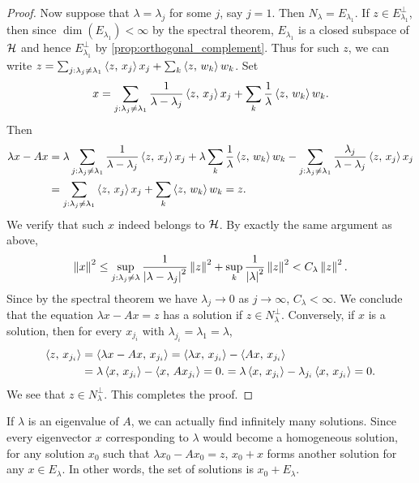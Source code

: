\begin{proof}
    Now suppose that $\lambda = \lambda_{j}$ for some $j$, say $j=1$. Then $N_\lambda = E_{\lambda_1}$. 
    If $z\in E_{\lambda_1}^\perp$, then since $\dim(E_{\lambda_1})<\infty$ by the spectral theorem, 
    $E_{\lambda_1}$ is a closed subspace of $\mathcal{H}$ and hence $E_{\lambda_1}^\perp$ by 
    \cref{prop:orthogonal_complement}. Thus for such $z$, we can write $z = 
    \sum_{j:\lambda_j\neq\lambda_1} \left\langle {z},\, {x_j} \right\rangle x_j + \sum_k\left\langle {z},\, {w_k} \right\rangle w_k$. 
    Set 
    \begin{equation*}
        x = \sum_{j:\lambda_j\neq\lambda_1}\frac{1}{\lambda-\lambda_j}\left\langle {z},\, {x_j} \right\rangle x_j + \sum_k\frac{1}{\lambda}\left\langle {z},\, {w_k} \right\rangle w_k.
    \end{equation*}
    Then 
    \begin{equation*}
        \begin{split}
            \lambda x - Ax 
            &= \lambda\sum_{j:\lambda_j\neq\lambda_1}\frac{1}{\lambda-\lambda_j}\left\langle {z},\, {x_j} \right\rangle x_j + \lambda\sum_k\frac{1}{\lambda}\left\langle {z},\, {w_k} \right\rangle w_k - \sum_{j:\lambda_j\neq\lambda_1}\frac{\lambda_j}{\lambda-\lambda_j}\left\langle {z},\, {x_j} \right\rangle x_j \\
            &= \sum_{j:\lambda_j\neq\lambda_1}\left\langle {z},\, {x_j} \right\rangle x_j + \sum_k\left\langle {z},\, {w_k} \right\rangle w_k = z.
        \end{split}
    \end{equation*}
    We verify that such $x$ indeed belongs to $\mathcal{H}$. By exactly the same argument as above, 
    \begin{equation*}
        \left\lVert {x} \right\rVert^2 \leq \sup_{j:\lambda_j\neq\lambda}\frac{1}{\left\lvert {\lambda-\lambda_j} \right\rvert^2}\left\lVert {z} \right\rVert^2 + \sup_k\frac{1}{\left\lvert {\lambda} \right\rvert^2}\left\lVert {z} \right\rVert^2 < C_\lambda\left\lVert {z} \right\rVert^2.
    \end{equation*}
    Since by the spectral theorem we have $\lambda_j\to 0$ as $j\to\infty$, $C_\lambda<\infty$.
    We conclude that the equation $\lambda x - Ax = z$ has a solution if $z\in N_\lambda^\perp$. 
    Conversely, if $x$ is a solution, then for every $x_{j_i}$ with $\lambda_{j_i} = \lambda_1 = \lambda$, 
    \begin{equation*}
        \begin{split}
            \left\langle {z},\, {x_{j_i}} \right\rangle &= \left\langle {\lambda x - Ax},\, {x_{j_i}} \right\rangle = \left\langle {\lambda x},\, {x_{j_i}} \right\rangle - \left\langle {Ax},\, {x_{j_i}} \right\rangle \\
            &= \lambda\left\langle {x},\, {x_{j_i}} \right\rangle - \left\langle {x},\, {Ax_{j_i}} \right\rangle = 0.
            = \lambda\left\langle {x},\, {x_{j_i}} \right\rangle - \lambda_{j_i}\left\langle {x},\, {x_{j_i}} \right\rangle = 0.
        \end{split}
    \end{equation*}
    We see that $z\in N_\lambda^\perp$. This completes the proof.
\end{proof}
\begin{remark}
    If $\lambda$ is an eigenvalue of $A$, we can actually find infinitely 
    many solutions. Since every eigenvector $x$ corresponding to $\lambda$ 
    would become a homogeneous solution, for any solution $x_0$ such that 
    $\lambda x_0 - Ax_0 = z$, $x_0 + x$ forms another solution for any 
    $x\in E_\lambda$. In other words, the set of solutions is $x_0 + E_\lambda$.
\end{remark}